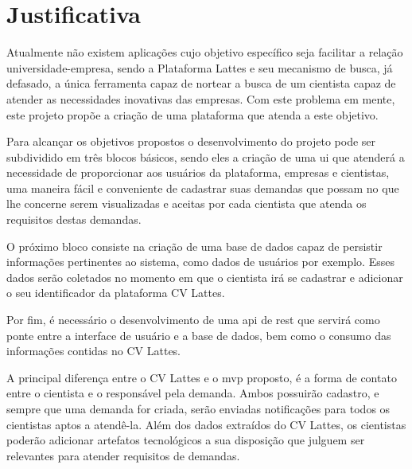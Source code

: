 \section{Justificativa}\label{sec:justificativa}

Atualmente não existem aplicações cujo objetivo específico seja facilitar a relação universidade-empresa, sendo a Plataforma Lattes e seu mecanismo de busca, já defasado, a única ferramenta capaz de nortear a busca de um cientista capaz de atender as necessidades inovativas das empresas. Com este problema em mente, este projeto propõe a criação de uma plataforma que atenda a este objetivo.

Para alcançar os objetivos propostos o desenvolvimento do projeto pode ser subdividido em três blocos básicos, sendo eles a criação de uma \gls{ui} que atenderá a necessidade de proporcionar aos usuários da plataforma, empresas e cientistas, uma maneira fácil e conveniente de cadastrar suas demandas que possam no que lhe concerne serem visualizadas e aceitas por cada cientista que atenda os requisitos destas demandas.

O próximo bloco consiste na criação de uma base de dados capaz de persistir informações pertinentes ao sistema, como dados de usuários por exemplo. Esses dados serão coletados no momento em que o cientista irá se cadastrar e adicionar o seu identificador da plataforma CV Lattes.

Por fim, é necessário o desenvolvimento de uma \gls{api} de \gls{rest} que servirá como ponte entre a interface de usuário e a base de dados, bem como o consumo das informações contidas no CV Lattes.

A principal diferença entre o CV Lattes e o \gls{mvp} proposto, é a forma de contato entre o cientista e o responsável pela demanda. Ambos possuirão cadastro, e sempre que uma demanda for criada, serão enviadas notificações para todos os cientistas aptos a atendê-la. Além dos dados extraídos do CV Lattes, os cientistas poderão adicionar artefatos tecnológicos a sua disposição que julguem ser relevantes para atender requisitos de demandas.



